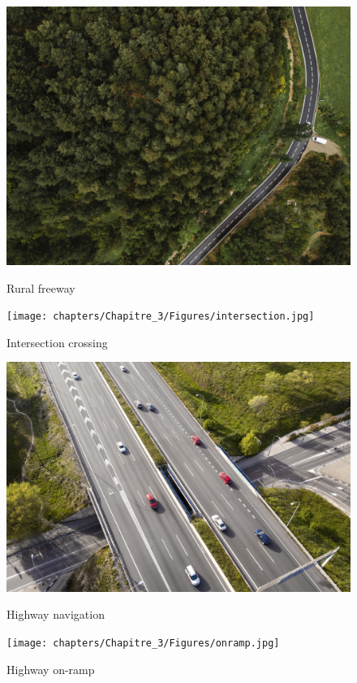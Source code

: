 \begin{figure}[ht]
\begin{minipage}[b]{0.45\linewidth}
\centering
\includegraphics[width=\textwidth]{chapters/Chapitre_3/Figures/rural.jpg}
\caption{Rural freeway}
\label{fig:rural}
\end{minipage}
\hspace{0.5cm}
\begin{minipage}[b]{0.45\linewidth}
\centering
\texttt{[image: chapters/Chapitre\_3/Figures/intersection.jpg]}
\caption{Intersection crossing}
\label{fig:intersection_urban}
\end{minipage}

\begin{minipage}[b]{0.45\linewidth}
\centering
\includegraphics[width=\textwidth]{chapters/Chapitre_3/Figures/autoroute.jpg}
\caption{Highway navigation}
\label{fig:Highway_navigation}
\end{minipage}
\hspace{0.5cm}
\begin{minipage}[b]{0.45\linewidth}
\centering
\texttt{[image: chapters/Chapitre\_3/Figures/onramp.jpg]}
\caption{Highway on-ramp}
\label{fig:on-ramp_highway}
\end{minipage}
\label{fig:scenarios_images}
\end{figure}



